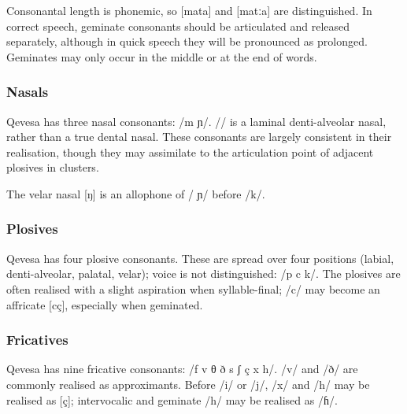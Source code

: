 \documentclass[grammar]{subfiles}
\begin{document}
Consonantal length is phonemic, so [mata] and [matːa] are distinguished.  In
correct speech, geminate consonants should be articulated and released
separately, although in quick speech they will be pronounced as prolonged.
Geminates may only occur in the middle or at the end of words.


\subsubsection{Nasals}
\label{sssec:nasals}

Qevesa has three nasal consonants: /m  ɲ/.  // is a laminal
denti-alveolar nasal, rather than a true dental nasal.  These consonants are
largely consistent in their realisation, though they may assimilate to the
articulation point of adjacent plosives in clusters. 

The velar nasal [ŋ] is an allophone of / ɲ/ before /k/.


\subsubsection{Plosives}
\label{sssec:plosives}

Qevesa has four plosive consonants.  These are spread over four positions
(labial, denti-alveolar, palatal, velar); voice is not distinguished: /p
 c k/.  The plosives are often realised with a slight aspiration when
syllable-final; /c/ may become an affricate [cç], especially when geminated.    



\subsubsection{Fricatives}
\label{sssec:fricatives}

Qevesa has nine fricative consonants: /f v θ ð s ʃ ç x h/.  /v/ and /ð/ are
commonly realised as approximants.  Before /i/ or /j/, /x/ and /h/ may be
realised as [ç]; intervocalic and geminate /h/ may be realised as /ɦ/. 

% 
\end{document}
